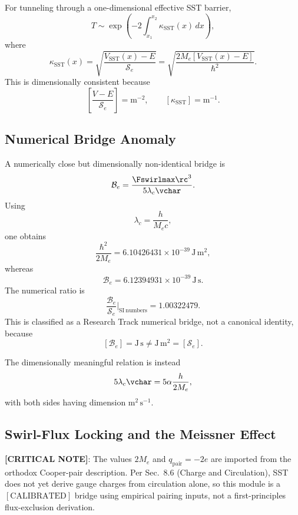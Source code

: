         For tunneling through a one-dimensional effective SST barrier,
        \[
            T
            \sim
            \exp\left(
                    -2\int_{x_1}^{x_2}\kappa_{\mathrm{SST}}(x)\,dx
            \right),
        \]
        where
        \[
            \kappa_{\mathrm{SST}}(x)
            =
            \sqrt{
                \frac{V_{\mathrm{SST}}(x)-E}{\mathcal S_e}
            }
            =
            \sqrt{
                \frac{2M_e\left[V_{\mathrm{SST}}(x)-E\right]}{\hbar^2}
            }.
        \]
        This is dimensionally consistent because
        \[
            \left[
                \frac{V-E}{\mathcal S_e}
            \right]
            =
            \mathrm{m^{-2}},
            \qquad
            [\kappa_{\mathrm{SST}}]=\mathrm{m^{-1}}.
        \]
    
    \subsection{Numerical Bridge Anomaly}
        
        A numerically close but dimensionally non-identical bridge is
        \[
            \mathcal B_e
            =
            \frac{\Fswirlmax \rc^3}
            {5\lambda_c\vchar}.
        \]
        Using
        \[
            \lambda_c=\frac{h}{M_e c},
        \]
        one obtains
        \[
            \frac{\hbar^2}{2M_e}
            =
            6.10426431\times10^{-39}\,\mathrm{J\,m^2},
        \]
        whereas
        \[
            \mathcal B_e
            =
            6.12394931\times10^{-39}\,\mathrm{J\,s}.
        \]
        The numerical ratio is
        \[
            \frac{\mathcal B_e}{\mathcal S_e}\bigg|_{\mathrm{SI\ numbers}}
            =
            1.00322479.
        \]
        This is classified as a Research Track numerical bridge, not a canonical
        identity, because
        \[
            [\mathcal B_e]=\mathrm{J\,s}
            \neq
            \mathrm{J\,m^2}=[\mathcal S_e].
        \]
        
        The dimensionally meaningful relation is instead
        \[
            5\lambda_c\vchar
            =
            5\alpha\frac{h}{2M_e},
        \]
        with both sides having dimension \(\mathrm{m^2\,s^{-1}}\).
    
    \subsection{Swirl-Flux Locking and the Meissner Effect}
        \textbf{[CRITICAL NOTE]}: The values $2M_e$ and $q_{\mathrm{pair}}=-2e$ are imported from the orthodox Cooper-pair description. Per Sec.~8.6 (Charge and Circulation), SST does not yet derive gauge charges from circulation alone, so this module is a $[\text{CALIBRATED}]$ bridge using empirical pairing inputs, not a first-principles flux-exclusion derivation.
        
